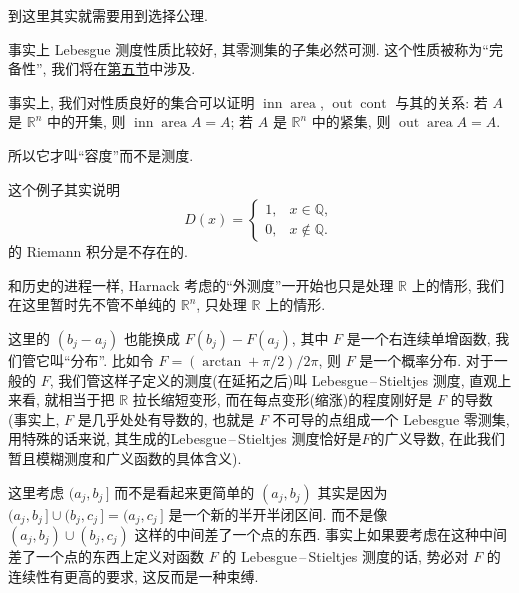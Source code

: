 \begin{alterendnote}
    到这里其实就需要用到选择公理.
\end{alterendnote}
\begin{alterendnote}
    事实上 Lebesgue 测度性质比较好, 其零测集的子集必然可测. 这个性质被称为``完备性'', 我们将在\hyperref[外测度与测度的完备化]{第五节}中涉及.
\end{alterendnote}
\begin{alterendnote}
    事实上, 我们对性质良好的集合可以证明 $\operatorname{inn}\operatorname{area}$, $\operatorname{out}\operatorname{cont}$ 与其的关系: 若 $A$ 是 $\mathbb R^n$ 中的开集, 则 $\operatorname{inn}\operatorname{area}A=A$; 若 $A$ 是 $\mathbb R^n$ 中的紧集, 则 $\operatorname{out}\operatorname{area}A=A$.
\end{alterendnote}
\begin{alterendnote}
    所以它才叫``容度''而不是测度.
\end{alterendnote}
\begin{alterendnote}
    这个例子其实说明 \[D(x)=
        \begin{cases}
            1, & x\in\mathbb Q,    \\
            0, & x\notin\mathbb Q.
        \end{cases}\] 的 Riemann 积分是不存在的.
\end{alterendnote}
\begin{alterendnote}
    和历史的进程一样, Harnack 考虑的``外测度''一开始也只是处理 $\mathbb R$ 上的情形, 我们在这里暂时先不管不单纯的 $\mathbb R^n$, 只处理 $\mathbb R$ 上的情形.
\end{alterendnote}
\begin{alterendnote}
    这里的 $(b_j-a_j)$ 也能换成 $F(b_j)-F(a_j)$, 其中 $F$ 是一个右连续单增函数, 我们管它叫``分布''. 比如令 $F=(\mathord{\arctan} + \pi /2)/2\pi $, 则 $F$ 是一个概率分布. 对于一般的 $F$, 我们管这样子定义的测度(在延拓之后)叫 Lebesgue\,--\,Stieltjes 测度, 直观上来看, 就相当于把 $\mathbb R$ 拉长缩短变形, 而在每点变形(缩涨)的程度刚好是 $F$ 的导数(事实上, $F$ 是几乎处处有导数的, 也就是 $F$ 不可导的点组成一个 Lebesgue 零测集, 用特殊的话来说, 其生成的Lebesgue\,--\,Stieltjes 测度恰好是$F$的广义导数, 在此我们暂且模糊测度和广义函数的具体含义).
\end{alterendnote}
\begin{alterendnote}
    这里考虑 $(a_j,b_j\,]$ 而不是看起来更简单的 $(a_j,b_j)$ 其实是因为 $(a_j,b_j\,]\cup (b_j,c_j\,]  = (a_j,c_j\,]$ 是一个新的半开半闭区间. 而不是像 $(a_j,b_j)\cup (b_j,c_j)$ 这样的中间差了一个点的东西. 事实上如果要考虑在这种中间差了一个点的东西上定义对函数 $F$ 的 Lebesgue\,--\,Stieltjes 测度的话, 势必对 $F$ 的连续性有更高的要求, 这反而是一种束缚.
\end{alterendnote}
